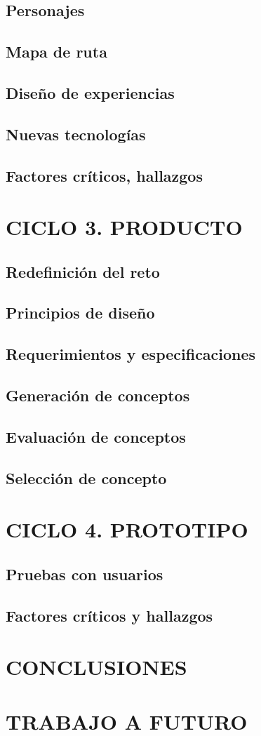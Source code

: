 \documentclass[12pt,letterpaper]{book}
\begin{document}
\section{Personajes}
\section{Mapa de ruta}
\section{Diseño de experiencias}
\section{Nuevas tecnologías}
\section{Factores críticos, hallazgos}

\newpage

\chapter{CICLO 3. PRODUCTO}
\section{Redefinición del reto}
\section{Principios de diseño}
\section{Requerimientos y especificaciones}
\section{Generación de conceptos}
\section{Evaluación de conceptos}
\section{Selección de concepto}

\newpage

\chapter{CICLO 4. PROTOTIPO}
\section{Pruebas con usuarios}
\section{Factores críticos y hallazgos}

\newpage

\chapter{CONCLUSIONES}

\chapter{TRABAJO A FUTURO}
\end{document}
